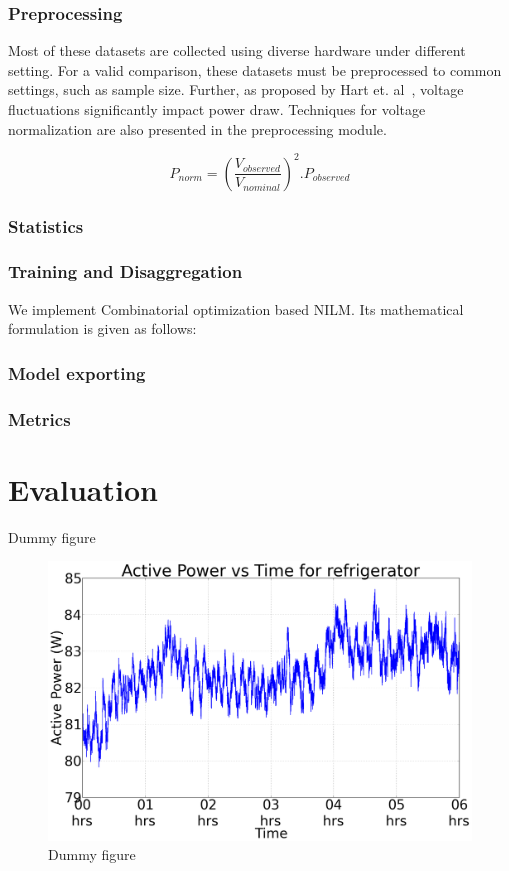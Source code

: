 \documentclass{sig-alternate}
\begin{document}
\subsubsection{Preprocessing}Most of these datasets are collected using diverse hardware under different setting. For a valid comparison, these datasets must be preprocessed to common settings, such as sample size. Further, as proposed by Hart et. al~\cite{hart_1992}, voltage fluctuations significantly impact power draw. Techniques for voltage normalization are also presented in the preprocessing module.

$$P_{norm} = (\frac{V_{observed}}{V_{nominal}})^2.P_{observed}$$

\subsubsection{Statistics} 

\subsubsection{Training and Disaggregation}
We implement Combinatorial optimization based NILM. Its mathematical formulation is given as follows:


\subsubsection{Model exporting}

\subsubsection{Metrics}

\section{Evaluation}
\label{evaluation}
Dummy figure
\begin{figure}
\centering \includegraphics[scale=0.1]{figures/after_repair.png}
\caption{Dummy figure}
\label{fig:dummy}
\end{figure}
\end{document}
